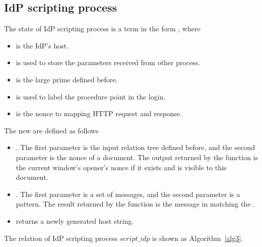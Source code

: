 \begin{appendices}
\subsection{IdP scripting process}
The state of IdP scripting process  is a term in the form , where 
\begin{itemize}
\item {} is the IdP's host.
\item {} is used to store the parameters received from other process.
\item {} is the large prime defined before.
\item {} is used to label the procedure point in the login.
\item {} is the nonce to mapping HTTP request and response.
\end{itemize}
 The new  are defined as follows
 \begin{itemize}
 \item {}. The first parameter is the input relation tree defined before, and the second parameter is the nonce of a document. The output returned by the function is the current window's opener's nonce if it exists and is visible to this document.  
  \item {}. The first parameter is a set of messages, and the second parameter is a pattern. The result returned by the function is the message in  matching the .
  \item {} returns a newly generated host string. 
 \end{itemize}
 The relation of IdP scripting process $script\_idp$ is shown as Algorithm~\ref{alg3}.


\end{appendices}
